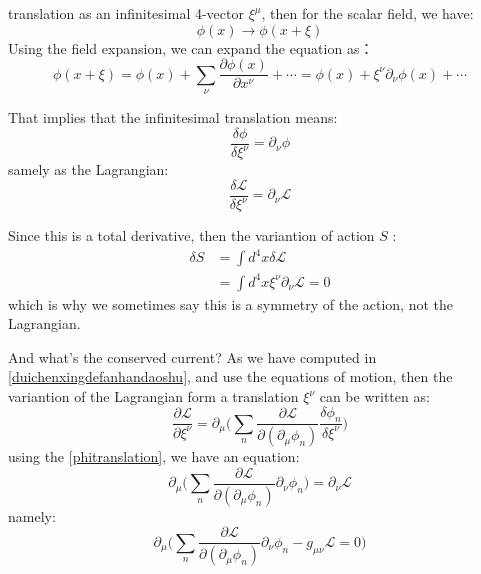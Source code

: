 \documentclass[12pt,openany]{book}
\begin{document}
	translation as an infinitesimal 4-vector $\xi^\mu$, then for the scalar field, we have:
	\begin{equation}
		\phi(x)\rightarrow\phi(x+\xi)
	\end{equation}
	Using the field expansion, we can expand the equation as：
	\begin{equation}
		\phi(x+\xi)=\phi(x)+\sum_\nu \frac{\partial\phi(x)}{\partial x^\nu}+\cdots=\phi(x)+\xi^\nu\partial_\nu\phi(x)+\cdots
	\end{equation}\par 
	That implies that the infinitesimal translation means:
	\begin{equation}\label{phitranslation}
		\frac{\delta\phi}{\delta\xi^\nu}=\partial_\nu\phi
	\end{equation}
	samely as the Lagrangian:
	\begin{equation}
		\frac{\delta\mathcal{L}}{\delta\xi^\nu}=\partial_\nu\mathcal{L}
	\end{equation}\par 
	Since this is a total derivative, then the variantion of action $S$ :
	\begin{equation}
		\begin{aligned}
			\delta S&=\int d^4x \delta\mathcal{L}\\
			&=\int d^4x \xi^\nu\partial_\nu\mathcal{L}=0
		\end{aligned}
	\end{equation}
	which is why we sometimes say this is a symmetry of the action, not the Lagrangian.\par 
	And what's the conserved current? As we have computed in \eqref{duichenxingdefanhandaoshu}, and use the equations of motion, then the variantion of the 
	Lagrangian form a translation $\xi^\nu$ can be written as:
	\begin{equation}
		\frac{\partial \mathcal{L}}{\partial \xi^\nu}=\partial_\mu\big(\sum_n\frac{\partial\mathcal{L}}{\partial(\partial_\mu\phi_n)}\frac{\delta\phi_n}{\delta\xi^\nu}\big)
	\end{equation}
	using the \eqref{phitranslation}, we have an equation:
	\begin{equation}
		\partial_\mu\big(\sum_n\frac{\partial\mathcal{L}}{\partial(\partial_\mu\phi_n)}\partial_\nu\phi_n\big)=\partial_\nu\mathcal{L}
	\end{equation}
	namely:
	\begin{equation}
		\partial_\mu\big( \sum_n\frac{\partial\mathcal{L}}{\partial(\partial_\mu\phi_n)}\partial_\nu\phi_n-g_{\mu\nu}\mathcal{L}=0       \big)
	\end{equation}
\end{document}
